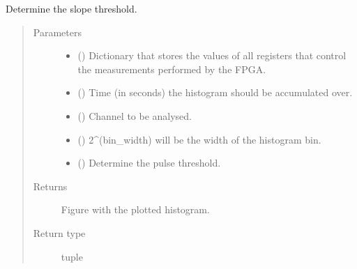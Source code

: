 \documentclass[letterpaper,10pt,english]{sphinxmanual}
\begin{document}

\begin{fulllineitems}
\label{\detokenize{tes:tes.mca_control.slope_threshold}}
\sphinxAtStartPar
Determine the slope threshold.
\begin{quote}\begin{description}
\item[{Parameters}] \leavevmode\begin{itemize}
\item {} 
\sphinxAtStartPar
{} () \textendash{} Dictionary that stores the values of all registers that control
the measurements performed by the FPGA.

\item {} 
\sphinxAtStartPar
{} () \textendash{} Time (in seconds) the histogram should be accumulated over.

\item {} 
\sphinxAtStartPar
{} () \textendash{} Channel to be analysed.

\item {} 
\sphinxAtStartPar
{} () \textendash{} 2\textasciicircum{}(bin\_width) will be the width of the histogram bin.

\item {} 
\sphinxAtStartPar
{} () \textendash{} Determine the pulse threshold.

\end{itemize}

\item[{Returns}] \leavevmode
\sphinxAtStartPar
{} \textendash{} Figure with the plotted histogram.

\item[{Return type}] \leavevmode
\sphinxAtStartPar
tuple

\end{description}\end{quote}

\end{fulllineitems}
\end{document}
